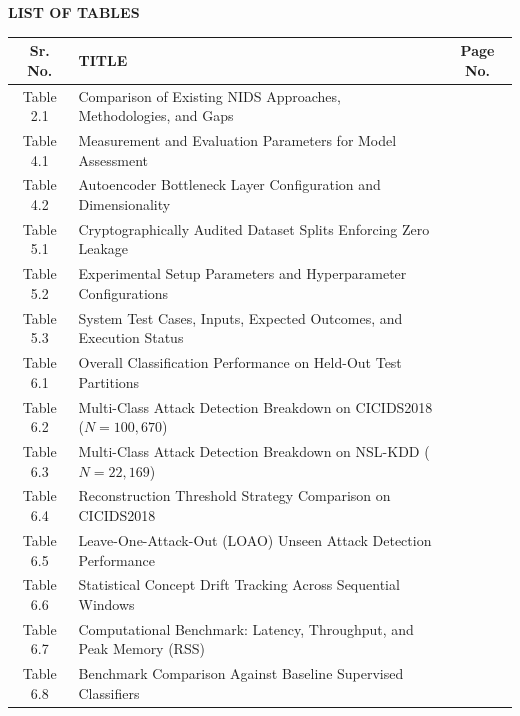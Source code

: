 \documentclass[12pt,a4paper]{report}
\begin{document}
\clearpage
{}
\setcounter{page}{8}
\thispagestyle{plain}

\begin{center}
{\Large\bfseries LIST OF TABLES}\\[0.4cm]
\end{center}

\noindent
\begin{tabularx}{\textwidth}{|c|X|c|}
\hline
\textbf{Sr. No.} & \textbf{\centering TITLE} & \textbf{Page No.} \\
\hline
Table 2.1 & Comparison of Existing NIDS Approaches, Methodologies, and Gaps & \pageref{tab:literature_review} \\
\hline
Table 4.1 & Measurement and Evaluation Parameters for Model Assessment & \pageref{tab:eval_params} \\
\hline
Table 4.2 & Autoencoder Bottleneck Layer Configuration and Dimensionality & \pageref{tab:ae_architecture} \\
\hline
Table 5.1 & Cryptographically Audited Dataset Splits Enforcing Zero Leakage & \pageref{tab:ch5_splits} \\
\hline
Table 5.2 & Experimental Setup Parameters and Hyperparameter Configurations & \pageref{tab:ch5_setup} \\
\hline
Table 5.3 & System Test Cases, Inputs, Expected Outcomes, and Execution Status & \pageref{tab:ch5_test_cases} \\
\hline
Table 6.1 & Overall Classification Performance on Held-Out Test Partitions & \pageref{tab:ch6_summary} \\
\hline
Table 6.2 & Multi-Class Attack Detection Breakdown on CICIDS2018 ($N = 100{,}670$) & \pageref{tab:ch6_cicids} \\
\hline
Table 6.3 & Multi-Class Attack Detection Breakdown on NSL-KDD ($N = 22{,}169$) & \pageref{tab:ch6_nslkdd} \\
\hline
Table 6.4 & Reconstruction Threshold Strategy Comparison on CICIDS2018 & \pageref{tab:ch6_thresh} \\
\hline
Table 6.5 & Leave-One-Attack-Out (LOAO) Unseen Attack Detection Performance & \pageref{tab:ch6_loao} \\
\hline
Table 6.6 & Statistical Concept Drift Tracking Across Sequential Windows & \pageref{tab:ch6_drift} \\
\hline
Table 6.7 & Computational Benchmark: Latency, Throughput, and Peak Memory (RSS) & \pageref{tab:ch6_latency} \\
\hline
Table 6.8 & Benchmark Comparison Against Baseline Supervised Classifiers & \pageref{tab:ch6_comparison} \\
\hline
\end{tabularx}
\end{document}
